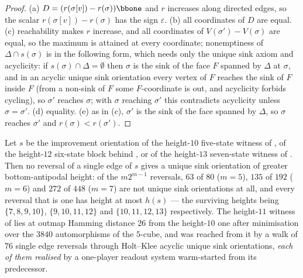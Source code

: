 \begin{proof}
(a) $D=(r(\sigma[v])-r(\sigma))\bbone$ and $r$ increases along directed edges,
so the scalar $r(\sigma[v])-r(\sigma)$ has the sign $\varepsilon$. (b) all
coordinates of $D$ are equal. (c) reachability makes $r$ increase, and all
coordinates of $V(\sigma')-V(\sigma)$ are equal, so the maximum is attained at
every coordinate; nonemptiness of $\Delta\cap s(\sigma)$ is
 in the following form, which needs only the unique sink
axiom and acyclicity: if $s(\sigma)\cap\Delta=\emptyset$ then $\sigma$ is the
sink of the face $F$ spanned by $\Delta$ at $\sigma$, and in an acyclic unique
sink orientation every vertex of $F$ reaches the sink of $F$ inside $F$ (from
a non-sink of $F$ some $F$-coordinate is out, and acyclicity forbids
cycling), so $\sigma'$ reaches $\sigma$; with $\sigma$ reaching $\sigma'$ this
contradicts acyclicity unless $\sigma=\sigma'$. (d) equality. (e) as in (c),
$\sigma'$ is the sink of the face spanned by $\Delta$, so $\sigma$ reaches
$\sigma'$ and $r(\sigma)<r(\sigma')$.
\end{proof}

\begin{proposition}
\label{oc:local-max}
Let $s$ be the improvement orientation of the height-$10$ five-state witness of
, of the height-$12$ six-state block behind
, or of the height-$13$ seven-state witness of
. Then no reversal of a single edge of $s$ gives
a unique sink orientation of greater bottom-antipodal height: of the
$m2^{m-1}$ reversals, $63$ of $80$ ($m=5$), $135$ of $192$ ($m=6$) and $272$
of $448$ ($m=7$) are not unique sink orientations at all, and every reversal
that is one has height at most $h(s)$ --- the surviving heights being
$\{7,8,9,10\}$, $\{9,10,11,12\}$ and $\{10,11,12,13\}$ respectively. The
height-$11$ witness of  lies at outmap Hamming
distance $26$ from the height-$10$ one after minimisation over the $3840$
automorphisms of the $5$-cube, and was reached from it by a walk of $76$
single edge reversals through Holt--Klee acyclic unique sink orientations,
\emph{each of them realised} by a one-player readout system warm-started from
its predecessor.
\end{proposition}